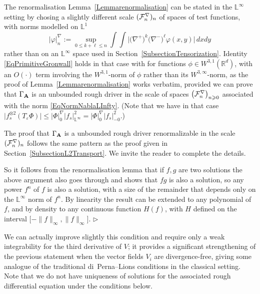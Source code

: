 \documentclass[11pt,a4paper]{amsart}
\newcommand{\RR}{\mathbb{R}}  \newcommand{\CC}{\mathbb{C}}  \newcommand{\LL}{\mathbb{L}}  \newcommand{\WW}{\mathbb{W}}
\renewcommand{\leq}{\leqslant}
\renewcommand{\geq}{\geqslant}
\newcommand{\ssk}{\smallskip}
\numberwithin{equation}{section} %
\newenvironment{Dem}{%
    \begin{list}{\hspace{0.5cm}{\sc Proof --}}{%
        \setlength{\topsep}{0pt}%
        \setlength{\leftmargin}{0pt}%
        \setlength{\rightmargin}{0pt}%
        \setlength{\listparindent}{0pt}%
        \setlength{\itemindent}{0pt}%
        \setlength{\parsep}{0pt}%
        \addtolength{\leftmargin}{20pt}%
        \addtolength{\rightmargin}{0pt}%
    } \item }{\hfill{\space $\rhd$}\end{list}\smallskip}
\begin{document}
\begin{Dem}  
The renormalisation Lemma~\ref{Lemmarenormalisation} can be stated in the $\LL^\infty$ setting by chosing a slightly different scale $(\mathcal{F}^\nabla_n)_n$ of spaces of test functions,  with norms modelled on $\LL^1$ 
\begin{equation}
\label{EqNormNablaLInfty} 
\big| \varphi \big|^\nabla_n := \sup_{0 \leqslant k + \ell \leqslant n} \int \int \Big|\big(\nabla^+\big)^k \big(\nabla^-\big)^\ell \varphi (x, y) \Big|\,dx dy  
\end{equation}
rather than on an $\LL^\infty$ space used in Section~\ref{SubsectionTensorization}. Identity \eqref{EqPrimitiveGronwall} holds in that case with for functions $\phi\in W^{3,1}(\RR^d)$, with an $O(\cdot)$ term involving the $W^{3,1}$-norm of $\phi$ rather than its $W^{3,\infty}$-norm, as the proof of Lemma~\ref{Lemmarenormalisation} works verbatim, provided we can prove that $\Gamma_{\bf A}$ is an unbounded rough driver in the scale of spaces $\big(\mcF_n^\nabla\big)_{n\geq 0}$ associated with the norm \eqref{EqNormNablaLInfty}.  (Note that we have in that case $\big| f_s^{\otimes 2}(T_\varepsilon \Phi)\big| \leq |\Phi|_0^\nabla \big| f_s\big|_{\LL^\infty}^2 = |\Phi|_0^\nabla \big| f_s\big|_{-0}^2$.)

\medskip

The proof that $\Gamma_{\bf A}$ is a unbounded rough driver renormalizable in the scale $(\mathcal{F}^\nabla_n)_n$ follows the same pattern as the proof given in Section~\ref{SubsectionL2Transport}. We invite the reader to complete the details.

\ssk

So it follows from the renormalisation lemma that if $f, g$ are two solutions the above argument also goes through and shows that $fg$ is also a solution, so any power $f^n$ of $f$ is also a solution, with a size of the remainder that depends only on the $\LL^{\infty}$ norm of $f^n$. By linearity the result can be extended to any polynomial of $f$, and by density to any continuous function $H (f)$, with $H$ defined on the interval $\big[- \| f \|_{\infty}, \| f \|_{\infty}\big]$. 
\end{Dem}
 
\medskip

We can actually improve slightly this condition and require only a weak integrability for the third derivative of $V$; it provides a significant strengthening of the previous statement when the vector fields $V_i$ are divergence-free, giving some analogue of the traditional di~Perna--Lions conditions in the classical setting. Note that we do not have uniqueness of solutions for the associated rough differential equation under the conditions below.
\end{document}
